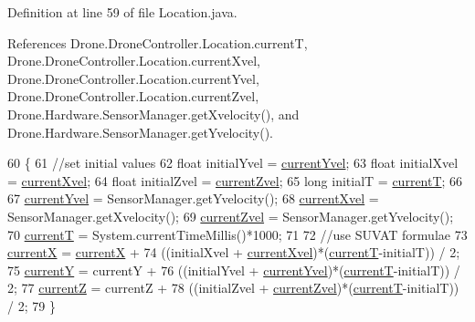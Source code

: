 Definition at line 59 of file Location.\+java.



References Drone.\+Drone\+Controller.\+Location.\+current\+T, Drone.\+Drone\+Controller.\+Location.\+current\+Xvel, Drone.\+Drone\+Controller.\+Location.\+current\+Yvel, Drone.\+Drone\+Controller.\+Location.\+current\+Zvel, Drone.\+Hardware.\+Sensor\+Manager.\+get\+Xvelocity(), and Drone.\+Hardware.\+Sensor\+Manager.\+get\+Yvelocity().


\begin{DoxyCode}
60     \{
61         \textcolor{comment}{//set initial values}
62         \textcolor{keywordtype}{float} initialYvel = \hyperlink{class_drone_1_1_drone_controller_1_1_location_adff5260059e632576967773ffd15f219}{currentYvel};
63         \textcolor{keywordtype}{float} initialXvel = \hyperlink{class_drone_1_1_drone_controller_1_1_location_a8691b4eb0647ca3cf7d3a93f87bc6704}{currentXvel};
64         \textcolor{keywordtype}{float} initialZvel = \hyperlink{class_drone_1_1_drone_controller_1_1_location_a64772870a1e3318223eb6998fc8b8b5a}{currentZvel};
65         \textcolor{keywordtype}{long}  initialT    = \hyperlink{class_drone_1_1_drone_controller_1_1_location_a079530c9c06ca16dc9f658b88b9c44b2}{currentT};
66         
67         \hyperlink{class_drone_1_1_drone_controller_1_1_location_adff5260059e632576967773ffd15f219}{currentYvel} = SensorManager.getYvelocity();
68         \hyperlink{class_drone_1_1_drone_controller_1_1_location_a8691b4eb0647ca3cf7d3a93f87bc6704}{currentXvel} = SensorManager.getXvelocity();
69         \hyperlink{class_drone_1_1_drone_controller_1_1_location_a64772870a1e3318223eb6998fc8b8b5a}{currentZvel} = SensorManager.getYvelocity();
70         \hyperlink{class_drone_1_1_drone_controller_1_1_location_a079530c9c06ca16dc9f658b88b9c44b2}{currentT}    = System.currentTimeMillis()*1000;
71         
72         \textcolor{comment}{//use SUVAT formulae}
73         \hyperlink{class_drone_1_1_drone_controller_1_1_location_ab30780155f9666ba1585f182c2c0a220}{currentX} = \hyperlink{class_drone_1_1_drone_controller_1_1_location_ab30780155f9666ba1585f182c2c0a220}{currentX} +
74                 ((initialXvel + \hyperlink{class_drone_1_1_drone_controller_1_1_location_a8691b4eb0647ca3cf7d3a93f87bc6704}{currentXvel})*(\hyperlink{class_drone_1_1_drone_controller_1_1_location_a079530c9c06ca16dc9f658b88b9c44b2}{currentT}-initialT)) / 2;
75         \hyperlink{class_drone_1_1_drone_controller_1_1_location_a27aef452beeabcbace54668504ca341d}{currentY} = currentY +
76                 ((initialYvel + \hyperlink{class_drone_1_1_drone_controller_1_1_location_adff5260059e632576967773ffd15f219}{currentYvel})*(\hyperlink{class_drone_1_1_drone_controller_1_1_location_a079530c9c06ca16dc9f658b88b9c44b2}{currentT}-initialT)) / 2;
77         \hyperlink{class_drone_1_1_drone_controller_1_1_location_a83d271c394653007f31f7a5a31dcb2a6}{currentZ} = currentZ +
78                 ((initialZvel + \hyperlink{class_drone_1_1_drone_controller_1_1_location_a64772870a1e3318223eb6998fc8b8b5a}{currentZvel})*(\hyperlink{class_drone_1_1_drone_controller_1_1_location_a079530c9c06ca16dc9f658b88b9c44b2}{currentT}-initialT)) / 2;
79     \}
\end{DoxyCode}



